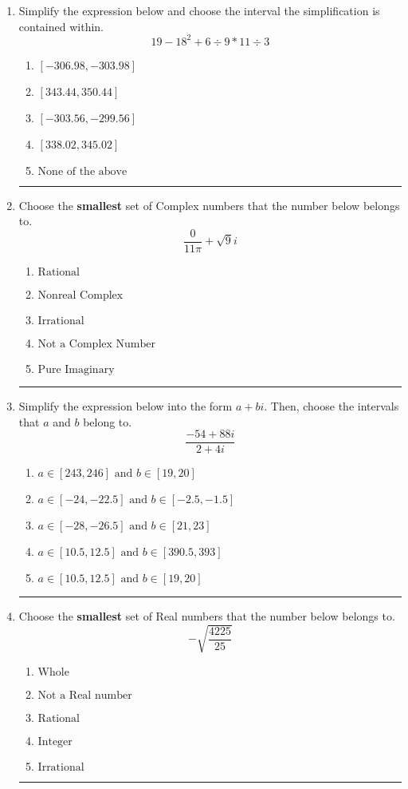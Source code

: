 \documentclass[14pt]{extbook}
\newcommand{\litem}[1]{\item#1\hspace*{-1cm}\rule{\textwidth}{0.4pt}}
\begin{document}
\begin{enumerate}
\litem{
Simplify the expression below and choose the interval the simplification is contained within.\[ 19 - 18^2 + 6 \div 9 * 11 \div 3 \]\begin{enumerate}[label=\Alph*.]
\item \( [-306.98, -303.98] \)
\item \( [343.44, 350.44] \)
\item \( [-303.56, -299.56] \)
\item \( [338.02, 345.02] \)
\item \( \text{None of the above} \)

\end{enumerate} }
\litem{
Choose the \textbf{smallest} set of Complex numbers that the number below belongs to.\[ \frac{0}{11 \pi}+\sqrt{9}i \]\begin{enumerate}[label=\Alph*.]
\item \( \text{Rational} \)
\item \( \text{Nonreal Complex} \)
\item \( \text{Irrational} \)
\item \( \text{Not a Complex Number} \)
\item \( \text{Pure Imaginary} \)

\end{enumerate} }
\litem{
Simplify the expression below into the form $a+bi$. Then, choose the intervals that $a$ and $b$ belong to.\[ \frac{-54 + 88 i}{2 + 4 i} \]\begin{enumerate}[label=\Alph*.]
\item \( a \in [243, 246] \text{ and } b \in [19, 20] \)
\item \( a \in [-24, -22.5] \text{ and } b \in [-2.5, -1.5] \)
\item \( a \in [-28, -26.5] \text{ and } b \in [21, 23] \)
\item \( a \in [10.5, 12.5] \text{ and } b \in [390.5, 393] \)
\item \( a \in [10.5, 12.5] \text{ and } b \in [19, 20] \)

\end{enumerate} }
\litem{
Choose the \textbf{smallest} set of Real numbers that the number below belongs to.\[ -\sqrt{\frac{4225}{25}} \]\begin{enumerate}[label=\Alph*.]
\item \( \text{Whole} \)
\item \( \text{Not a Real number} \)
\item \( \text{Rational} \)
\item \( \text{Integer} \)
\item \( \text{Irrational} \)


\end{enumerate}}
\end{enumerate}
\end{document}
